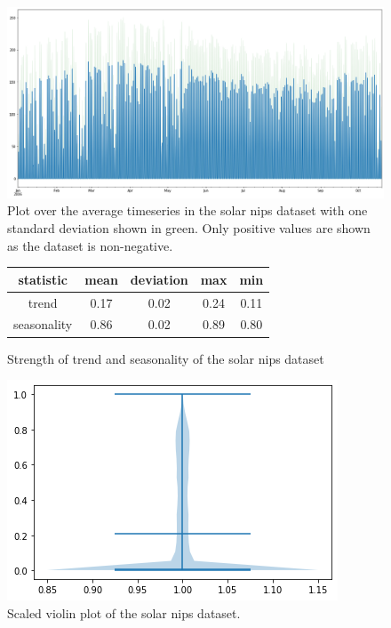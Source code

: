 \begin{figure}[htb]
    \centering
      \includegraphics[width=\linewidth]{4_designing/figures/solar_nips_plot.png}
      \caption{Plot over the average timeseries in the solar nips dataset with one standard deviation shown in green. Only positive values are shown as the dataset is non-negative.}
      \label{fig:solar_nips_plot}
    \endminipage\hfill
\end{figure}

\begin{figure}[htb]
    \centering
        \begin{center}
            \begin{tabular}{||c | c | c | c | c |} 
                \hline
                statistic & mean & deviation & max & min\\
                \hline
                trend & 0.17 & 0.02 & 0.24 & 0.11 \\
                \hline
                seasonality & 0.86 & 0.02 & 0.89 & 0.80 \\
                \hline
                \hline
            \end{tabular}
            \caption{Strength of trend and seasonality of the solar nips dataset}
        \end{center}
    \endminipage\hfill
      \includegraphics[width=\linewidth]{4_designing/figures/solar_nips_violin.png}
      \caption{Scaled violin plot of the solar nips dataset.}
      \label{fig:solar_nips_violin}
    \endminipage\hfill
\end{figure}



